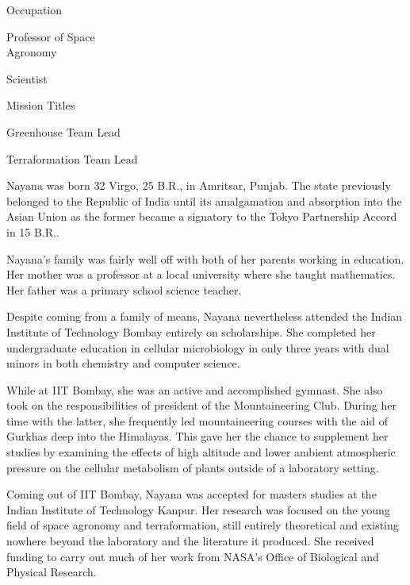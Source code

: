 {        \bTR
            \bTC Occupation \eTC
            \bTC
                \startitemize[4]
                \startpacked
                \item Professor of Space\\Agronomy
                \item Scientist
                \stoppacked
                \stopitemize
            \eTC
        \eTR
        
        \bTR
            \bTC Mission Titles \eTC
            \bTC
                \startitemize[4]
                \startpacked
                \item Greenhouse Team Lead
                \item Terraformation Team Lead
                \stoppacked
                \stopitemize
            \eTC
        \eTR
    \eTABLEbody

    \eTABLE
}

Nayana was born 32 Virgo, 25 B.R., in Amritsar, Punjab. The state previously belonged to the Republic of India until its amalgamation and absorption into the Asian Union as the former became a signatory to the Tokyo Partnership Accord in 15 B.R..

Nayana's family was fairly well off with both of her parents working in education. Her mother was a professor at a local university where she taught mathematics. Her father was a primary school science teacher.

Despite coming from a family of means, Nayana nevertheless attended the Indian Institute of Technology Bombay entirely on scholarships. She completed her undergraduate education in cellular microbiology in only three years with dual minors in both chemistry and computer science.

While at IIT Bombay, she was an active and accomplished gymnast. She also took on the responsibilities of president of the Mountaineering Club. During her time with the latter, she frequently led mountaineering courses with the aid of Gurkhas deep into the Himalayas. This gave her the chance to supplement her studies by examining the effects of high altitude and lower ambient atmospheric pressure on the cellular metabolism of plants outside of a laboratory setting.

Coming out of IIT Bombay, Nayana was accepted for masters studies at the Indian Institute of Technology Kanpur. Her research was focused on the young field of space agronomy and terraformation, still entirely theoretical and existing nowhere beyond the laboratory and the literature it produced. She received funding to carry out much of her work from NASA's Office of Biological and Physical Research.

